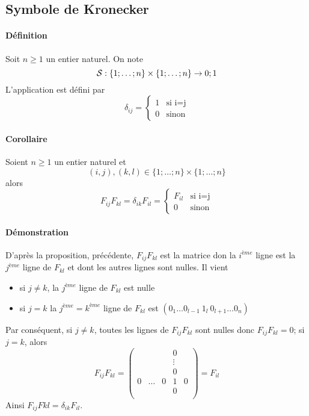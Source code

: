 %
\subsection{Symbole de Kronecker}
%
\paragraph{Définition} Soit $n \geq 1$ un entier naturel. On note
$$\mathcal{S}: \{1; \ldots; n\}\times\{1; \ldots; n \} \rightarrow {0; 1}$$
L'application est défini par
$$\delta_{ij} = \left\{\begin{array}{lr} 1 & \text{si i=j} \\ 0 & \text{sinon} \end{array} \right.$$ 

\paragraph{Corollaire} Soient $n \geq 1$ un entier naturel et
$$(i, j), (k, l) \in \{1; \ldots; n\}\times\{1; \ldots; n\}$$
alors
$$F_{ij}F_{kl} = \delta_{ik} F_{il} = 
  \left\{\begin{array}{lr} F_{il} & \text{si i=j} \\ 0 & \text{sinon} \end{array} \right.$$

\paragraph{Démonstration} D'après la proposition, précédente, $F_{ij} F_{kl}$ est la matrice don la $i^{ème}$ ligne est la $j^{ème}$ ligne de $F_{kl}$ et dont les autres lignes sont nulles. Il vient
\begin{itemize}
  \item si $j\neq k$, la $j^{ème}$ ligne de $F_{kl}$ est nulle
  \item si $j = k$ la $j^{ème} = k^{ème}$ ligne de $F_{kl}$ est $(0_{1} \ldots 0_{l-1} ~ 1_{l} ~ 0_{l+1} \ldots 0_{n})$
\end{itemize}
Par conséquent, si $j\neq k$, toutes les lignes de $F_{ij} F_{kl}$ sont nulles donc $F_{ij} F_{kl} = 0$; si $j=k$, alors 
$$F_{ij} F_{kl} = \begin{pmatrix} 
  & & & 0 & \\
  & & & \vdots & \\
  & & & 0 & \\
  0 & \ldots & 0 & 1 & 0 \\
  & & & 0 & \\
\end{pmatrix} = F_{il}$$
Ainsi $F_{ij} F{kl} = \delta_{ik} F_{il}$.

